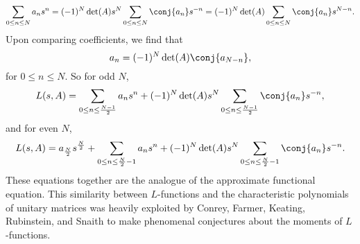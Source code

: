     \[
      \sum_{0 \le n \le N}a_{n}s^{n} = (-1)^{N}\det(A)s^{N}\sum_{0 \le n \le N}\conj{a_{n}}s^{-n} = (-1)^{N}\det(A)\sum_{0 \le n \le N}\conj{a_{n}}s^{N-n}.
    \]
    Upon comparing coefficients, we find that
    \[
      a_{n} = (-1)^{N}\det(A)\conj{a_{N-n}},
    \]
    for $0 \le n \le N$. So for odd $N$,
    \[
      L(s,A) = \sum_{0 \le n \le \frac{N-1}{2}}a_{n}s^{n}+(-1)^{N}\det(A)s^{N}\sum_{0 \le n \le \frac{N-1}{2}}\conj{a_{n}}s^{-n},
    \]
    and for even $N$,
    \[
      L(s,A) = a_{\frac{N}{2}}s^{\frac{N}{2}}+\sum_{0 \le n \le \frac{N}{2}-1}a_{n}s^{n}+(-1)^{N}\det(A)s^{N}\sum_{0 \le n \le \frac{N}{2}-1}\conj{a_{n}}s^{-n}.
    \]
    These equations together are the analogue of the approximate functional equation. This similarity between $L$-functions and the characteristic polynomials of unitary matrices was heavily exploited by Conrey, Farmer, Keating, Rubinstein, and Snaith to make phenomenal conjectures about the  moments of $L$-functions.